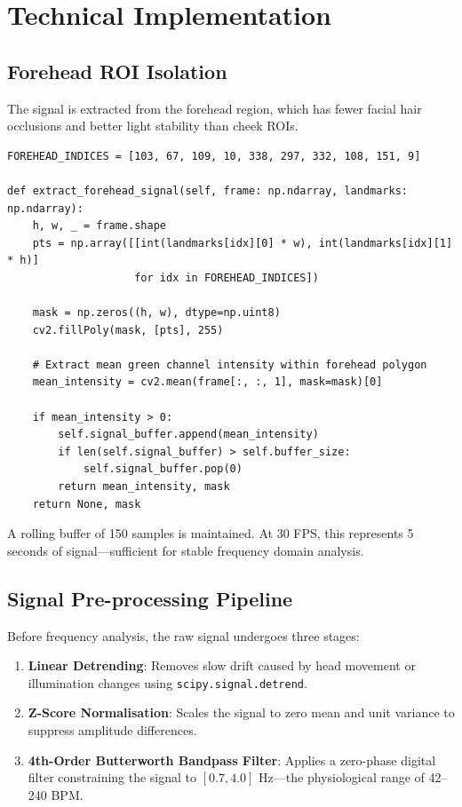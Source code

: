 \documentclass[12pt,a4paper]{report}
\begin{document}
\section{Technical Implementation}

\subsection{Forehead ROI Isolation}
The signal is extracted from the forehead region, which has fewer facial hair occlusions and better light stability than cheek ROIs.

\begin{lstlisting}[style=pythonstyle, caption={Forehead Signal Extraction --- Facial\_rPPG\_Modality.py}]
FOREHEAD_INDICES = [103, 67, 109, 10, 338, 297, 332, 108, 151, 9]

def extract_forehead_signal(self, frame: np.ndarray, landmarks: np.ndarray):
    h, w, _ = frame.shape
    pts = np.array([[int(landmarks[idx][0] * w), int(landmarks[idx][1] * h)]
                    for idx in FOREHEAD_INDICES])

    mask = np.zeros((h, w), dtype=np.uint8)
    cv2.fillPoly(mask, [pts], 255)

    # Extract mean green channel intensity within forehead polygon
    mean_intensity = cv2.mean(frame[:, :, 1], mask=mask)[0]

    if mean_intensity > 0:
        self.signal_buffer.append(mean_intensity)
        if len(self.signal_buffer) > self.buffer_size:
            self.signal_buffer.pop(0)
        return mean_intensity, mask
    return None, mask
\end{lstlisting}

A rolling buffer of 150 samples is maintained. At 30 FPS, this represents 5 seconds of signal---sufficient for stable frequency domain analysis.

\subsection{Signal Pre-processing Pipeline}
Before frequency analysis, the raw signal undergoes three stages:

\begin{enumerate}
    \item \textbf{Linear Detrending}: Removes slow drift caused by head movement or illumination changes using \texttt{scipy.signal.detrend}.
    \item \textbf{Z-Score Normalisation}: Scales the signal to zero mean and unit variance to suppress amplitude differences.
    \item \textbf{4th-Order Butterworth Bandpass Filter}: Applies a zero-phase digital filter constraining the signal to $[0.7, 4.0]$ Hz---the physiological range of 42--240 BPM.
\end{enumerate}
\end{document}
